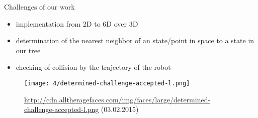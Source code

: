 \documentclass[%
  professionalfonts,%
  xcolor={%
    usenames,%
    dvipsnames,%
    svgnames,%
    table,%
    hyperref%
  }%
]{beamer}
\begin{document}
      \begin{frame}{Challenges of our work}
        \begin{itemize}
          \item implementation from 2D to 6D over 3D
          \item determination of the nearest neighbor of an state/point in space to a state in our tree
          \item checking of collision by the trajectory of the robot
        \end{itemize}
        
        \begin{figure}[h]
          \texttt{[image: 4/determined-challenge-accepted-l.png]}
          \scriptsize\caption{\scriptsize\url{http://cdn.alltheragefaces.com/img/faces/large/determined-challenge-accepted-l.png} (03.02.2015)}
          \label{fig:/determined-challenge-accepte}
        \end{figure}
        
      \end{frame}
      
\end{document}
